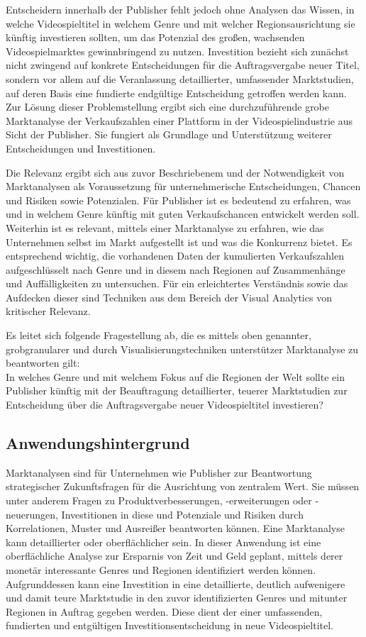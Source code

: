 \documentclass[usegeometry=true]{scrartcl}
\begin{document}
Entscheidern innerhalb der Publisher fehlt jedoch ohne Analysen das Wissen, in welche Videospieltitel in welchem Genre und mit welcher Regionsausrichtung sie künftig investieren sollten, 
um das Potenzial des großen, wachsenden Videospielmarktes gewinnbringend zu nutzen.
Investition bezieht sich zunächst nicht zwingend auf konkrete Entscheidungen für die Auftragsvergabe neuer Titel, 
sondern vor allem auf die Veranlassung detaillierter, umfassender Marktstudien, auf deren Basis eine fundierte endgültige Entscheidung getroffen werden kann.
Zur Lösung dieser Problemstellung ergibt sich eine durchzuführende grobe Marktanalyse der Verkaufszahlen einer Plattform in der Videospielindustrie aus Sicht der Publisher.
Sie fungiert als Grundlage und Unterstützung weiterer Entscheidungen und Investitionen.

Die Relevanz ergibt sich aus zuvor Beschriebenem und der Notwendigkeit von Marktanalysen als Voraussetzung für unternehmerische Entscheidungen, Chancen und Risiken sowie Potenzialen.\cite{Fleig.2020}
Für Publisher ist es bedeutend zu erfahren, was und in welchem Genre künftig mit guten Verkaufschancen entwickelt werden soll.
Weiterhin ist es relevant, mittels einer Marktanalyse zu erfahren, wie das Unternehmen selbst im Markt aufgestellt ist und was die Konkurrenz bietet. 
Es entsprechend wichtig, die vorhandenen Daten der kumulierten Verkaufszahlen aufgeschlüsselt nach Genre und in diesem nach Regionen auf Zusammenhänge und Auffälligkeiten zu untersuchen. 
Für ein erleichtertes Verständnis sowie das Aufdecken dieser sind Techniken aus dem Bereich der Visual Analytics von kritischer Relevanz.

Es leitet sich folgende Fragestellung ab, die es mittels oben genannter, grobgranularer und durch Visualisierungstechniken unterstützer Marktanalyse zu beantworten gilt:\\
In welches Genre und mit welchem Fokus auf die Regionen der Welt sollte ein Publisher künftig mit der Beauftragung detaillierter, teuerer Marktstudien zur Entscheidung über die Auftragsvergabe neuer Videospieltitel investieren?

\subsection{Anwendungshintergrund}
Marktanalysen sind für Unternehmen wie Publisher zur Beantwortung strategischer Zukunftsfragen für die Ausrichtung von zentralem Wert.
Sie müssen unter anderem Fragen zu Produktverbesserungen, -erweiterungen oder -neuerungen, Investitionen in diese und Potenziale und Risiken durch Korrelationen, Muster und Ausreißer beantworten können.\cite{Fleig.2020}
Eine Marktanalyse kann detaillierter oder oberflächlicher sein. 
In dieser Anwendung ist eine oberflächliche Analyse zur Ersparnis von Zeit und Geld geplant, 
mittels derer monetär interessante Genres und Regionen identifiziert werden können.
Aufgrunddessen kann eine Investition in eine detaillierte, deutlich aufwenigere und damit teure Marktstudie in den zuvor identifizierten Genres 
und mitunter Regionen in Auftrag gegeben werden. 
Diese dient der einer umfassenden, fundierten und entgültigen Investitionsentscheidung in neue Videospieltitel.
\end{document}
